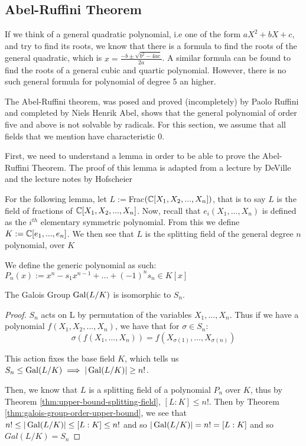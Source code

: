\subsection{Abel-Ruffini Theorem}

If we think of a general quadratic polynomial, i.e one of the form $aX^2+bX+c$, and try to find its roots, we know that there is a formula to find the roots of the general quadratic, which is $x = \frac{-b \pm \sqrt{b^2 - 4ac}}{2a}$. A similar formula can be found to find the roots of a general cubic and quartic polynomial. However, there is no such general formula for polynomial of degree 5 an higher.

The Abel-Ruffini theorem, was posed and proved (incompletely) by Paolo Ruffini and completed by Niels Henrik Abel, shows that the general polynomial of order five and above is not solvable by radicals. For this section, we assume that all fields that we mention have characteristic 0.

First, we need to understand a lemma in order to be able to prove the Abel-Ruffini Theorem. The proof of this lemma is adapted from a lecture by DeVille \cite{galois-lecture-polynomials} and the lecture notes by Hofscheier \cite{commutative-algebra-uon}

\newpage
For the following lemma, let $L :=$Frac$(\mathbb C[X_1,X_2,...,X_n])$, that is to say $L$ is the field of fractions of $\mathbb C[X_1,X_2,...,X_n]$. Now, recall that $e_i(X_1,...,X_n)$ is defined as the $i^{th}$ elementary symmetric polynomial. From this we define $K:=\mathbb C[e_1,...,e_n]$. 
We then see that $L$ is the splitting field of the general degree $n$ polynomial, over $K$

We define the generic polynomial as such:
$P_n(x) := x^n-s_1x^{n-1}+...+(-1)^ns_n \in K[x]$
    
\begin{lemma}\label{lemma:galois-symmetric}
    The Galois Group $\operatorname{Gal}(L/K)$ is isomorphic to $S_n$.
\end{lemma}

\begin{proof}

    $S_n$ acts on L by permutation of the variables $X_1,...,X_n$. Thus if we have a polynomial $f(X_1,X_2,...,X_n)$, we have that for $\sigma \in S_n$:
    $$   \sigma( f(X_1, \dots, X_n) )=f( X_{\sigma(1)},\dots,X_{\sigma(n)}) $$

    This action fixes the base field $K$, which tells us $S_n \leq \operatorname{Gal}(L/K) \implies |\operatorname{Gal}(L/K)|\geq n!$.

    Then, we know that $L$ is a splitting field of a polynomial $P_n$ over $K$, thus by Theorem \ref{thm:upper-bound-splitting-field}, $[L:K]\leq n!$. Then by Theorem \ref{thm:galois-group-order-upper-bound}, we see that $n!\leq |\operatorname{Gal}(L/K)|\leq [L:K]\leq n!$ and so $|\operatorname{Gal}(L/K)| = n! = [L:K]$ and so $Gal(L/K)=S_n$

\end{proof}

